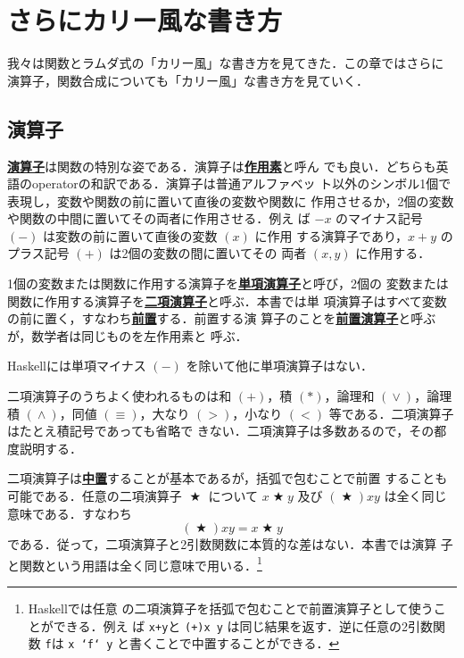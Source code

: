 \documentclass[a5paper,twoside,fleqn,draft]{jsbook}
\newcommand{\programminglanguage}[1]{\textsf{#1}}
\newcommand{\haskell}{\programminglanguage{Haskell}}
\newenvironment{leader}{\begingroup\gt}{\endgroup}
\newcommand{\keyword}[1]{{\underline{\textbf{#1}}}}
\newcommand{\code}[1]{\texttt{#1}}
\DeclareMathOperator{\mBinOp}{\bigstar}
\DeclareMathOperator{\mLogicalAnd}{\wedge}
\DeclareMathOperator{\mLogicalOr}{\vee}
\begin{document}
\chapter{さらにカリー風な書き方}
\label{ch:more-curry}

\begin{leader}
我々は関数とラムダ式の「カリー風」な書き方を見てきた．この章ではさらに
演算子，関数合成についても「カリー風」な書き方を見ていく．
\end{leader}

\section{演算子}

\keyword{演算子}は関数の特別な姿である．演算子は\keyword{作用素}と呼ん
でも良い．どちらも英語のoperatorの和訳である．演算子は普通アルファベッ
ト以外のシンボル1個で表現し，変数や関数の前に置いて直後の変数や関数に
作用させるか，2個の変数や関数の中間に置いてその両者に作用させる．例え
ば $-x$ のマイナス記号 $(-)$ は変数の前に置いて直後の変数 $(x)$ に作用
する演算子であり，$x+y$ のプラス記号 $(+)$ は2個の変数の間に置いてその
両者 $(x,y)$ に作用する．

1個の変数または関数に作用する演算子を\keyword{単項演算子}と呼び，2個の
変数または関数に作用する演算子を\keyword{二項演算子}と呼ぶ．本書では単
項演算子はすべて変数の前に置く，すなわち\keyword{前置}する．前置する演
算子のことを\keyword{前置演算子}と呼ぶが，数学者は同じものを左作用素と
呼ぶ．

\haskell には単項マイナス $(-)$ を除いて他に単項演算子はない．

二項演算子のうちよく使われるものは和 $(+)$，積 $(*)$，論理和
$(\mLogicalOr)$，論理積 $(\mLogicalAnd)$，同値 $(\equiv)$，大なり
$(>)$，小なり $(<)$ 等である．二項演算子はたとえ積記号であっても省略で
きない．二項演算子は多数あるので，その都度説明する．

二項演算子は\keyword{中置}することが基本であるが，括弧で包むことで前置
することも可能である．任意の二項演算子 $\mBinOp$ について $x\mBinOp y$
及び $(\mBinOp)xy$ は全く同じ意味である．すなわち
\begin{equation}
\left(\mBinOp\right)xy=x\mBinOp y
\end{equation}
である．従って，二項演算子と2引数関数に本質的な差はない．本書では演算
子と関数という用語は全く同じ意味で用いる．\footnote{\haskell では任意
の二項演算子を括弧で包むことで前置演算子として使うことができる．例え
ば \code{x+y}と \code{(+)x y} は同じ結果を返す．逆に任意の2引数関数
\code{f}は \code{x `f` y} と書くことで中置することができる．}
\end{document}
